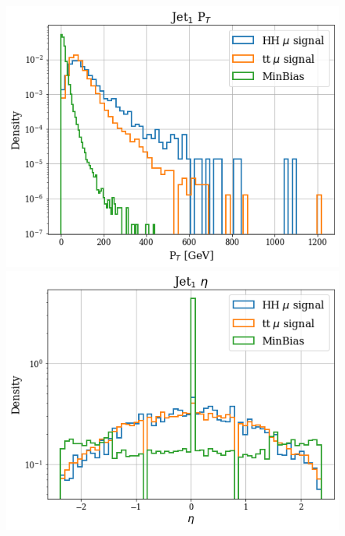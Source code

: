 \documentclass[../main.tex]{subfiles}
\begin{document}
\begin{figure}[!ht]
  \begin{minipage}[b]{0.33\linewidth}
    \centering
    \includegraphics[width=1\linewidth]{Chapters/Plots/Hist_1mu_jet1_Et.png}
  \end{minipage}%
  \begin{minipage}[b]{0.33\linewidth}
    \centering
    \includegraphics[width=1\linewidth]{Chapters/Plots/Hist_1mu_jet1_Eta.png}
  \end{minipage} %
  \begin{minipage}[b]{0.33\linewidth}

\end{minipage}
\end{figure}
\end{document}
